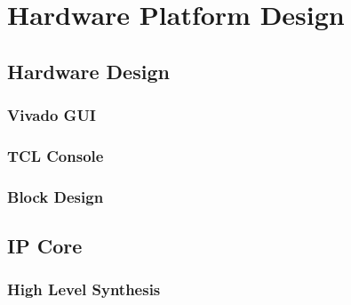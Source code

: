 

\chapter{Hardware Platform Design}



\section{Hardware Design}

\subsection{Vivado GUI}

\subsection{TCL Console}

\subsection{Block Design}

\section{IP Core}

\subsection{High Level Synthesis}
